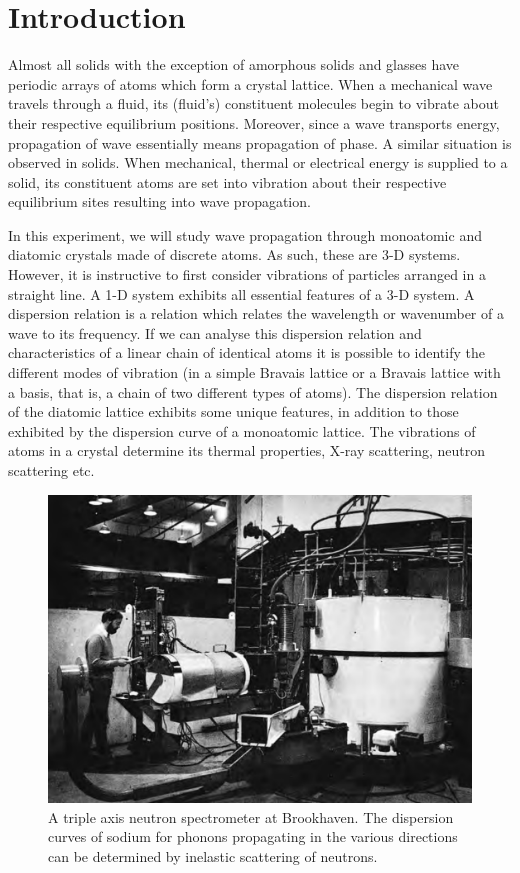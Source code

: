 \documentclass[%
 aip,
 amsmath,amssymb,
 reprint, floatfix%
]{revtex4-1}
\begin{document}
\section{Introduction}
    Almost all solids with the exception of amorphous solids and glasses have periodic arrays of atoms which form a crystal lattice. When a mechanical wave travels through a fluid, its (fluid's) constituent molecules begin to vibrate about their respective equilibrium positions. Moreover, since a wave transports energy, propagation of wave essentially means propagation of phase. A similar situation is observed in solids. When mechanical, thermal or electrical energy is supplied to a solid, its constituent atoms are set into vibration about their respective equilibrium sites resulting into wave propagation.
    \par
    In this experiment, we will study wave propagation through monoatomic and diatomic crystals made of discrete atoms. As such, these are 3-D systems. However, it is instructive to first consider vibrations of particles arranged in a straight line. A 1-D system exhibits all essential features of a 3-D system. A dispersion relation is a relation which relates the wavelength or wavenumber of a wave to its frequency. If we can analyse this dispersion relation and characteristics of a linear chain of identical atoms it is possible to identify the different modes of vibration (in a simple Bravais lattice or a Bravais lattice with a basis, that is, a chain of two different types of atoms). The dispersion relation of the diatomic lattice exhibits some unique features, in addition to those exhibited by the dispersion curve of a monoatomic lattice. The vibrations of atoms in a crystal determine its thermal properties, X-ray scattering, neutron scattering etc.
    \begin{figure}
        \centering
        \includegraphics[scale = 0.37]{Figures/neutronscattering.png}
        \caption{A triple axis neutron spectrometer at Brookhaven. The dispersion curves of sodium for phonons propagating in the various directions can be determined by inelastic scattering of neutrons.}
        \label{fig:neutronscattering}
    \end{figure}
\end{document}
